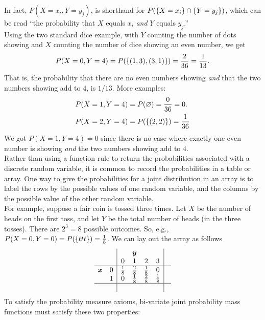 \noindent In fact, $P(X = x_i, Y=y_j)$, is shorthand for $P(\left\{X = x_i\right\} \cap \left\{Y = y_j\right\})$, which can be read ``the probability that $X$ equals $x_i$ \textit{and} $Y$ equals $y_j$.'' \\


\noindent Using the two standard dice example, with $Y$ counting the number of dots showing and $X$ counting the number of dice showing an even number, we get
\[
P(X = 0,Y= 4) = P(\left\{(1,3),(3,1)\right\}) = \frac{2}{36} = \frac{1}{13}. 
\]
That is, the probability that there are no even numbers showing \textit{and} that the two numbers showing add to $4$, is $1/13.$ More examples:
\begin{align*}
P(X = 1,Y= 4) & = P(\varnothing) = \frac{0}{36} = 0. \\
P(X=2,Y=4) & = P(\left\{(2,2)\right\}) = \frac{1}{36}
\end{align*}
We got $P(X=1,Y=4) = 0$ since there is no case where exactly one even number is showing \textit{and} the two numbers showing add to $4$. \\

\noindent Rather than using a function rule to return the probabilities associated with a discrete random variable, it is common to record the probabilities in a table or array. One way to give the probabilities for a joint distribution in an array is to label the rows by the possible values of one random variable, and the columns by the possible value of the other random variable. \\

\noindent For example, suppose a fair coin is tossed three times. Let $X$ be the number of heads on the first toss, and let $Y$ be the total number of heads (in the three tosses). There are $2^3 = 8$ possible outcomes. So, e.g., $P(X = 0,Y = 0) = P(\left\{ttt\right\}) = \frac{1}{8}$. We can lay out the array as follows
\[
\begin{array}{cc|cccc|c} 
&& \multicolumn{3}{c}{\boldsymbol{y}} & \\
&& \multicolumn{1}{c}{0} &  \multicolumn{1}{c}{1} &  \multicolumn{1}{c}{2} &  3 & \\ \hline

$$\boldsymbol{x}$$ \multirow{3}{*}{$$} &0& \frac{1}{8} & \frac{2}{8} & \frac{1}{8} & 0 & \\ 
								  &1&  0                 & \frac{1}{8} & \frac{2}{8} & \frac{1}{8} & \\ \hline
&&&&&&
\end{array}
\]
To satisfy the probability measure axioms, bi-variate joint probability mass functions must satisfy these two properties:

